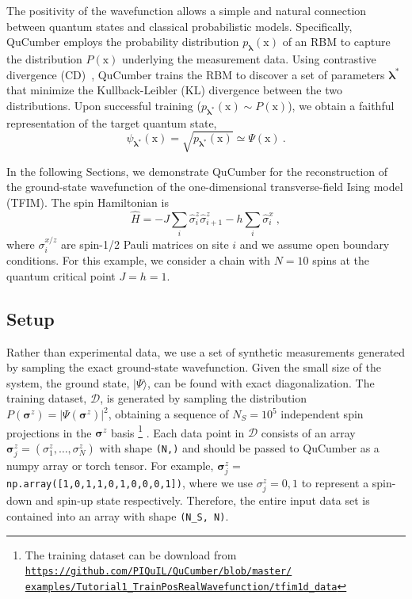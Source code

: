 \documentclass[submission, Phys, hidelnks]{SciPost}
\begin{document}
The positivity of the wavefunction allows a simple and natural connection between quantum states and classical probabilistic models. Specifically, QuCumber employs the probability distribution $p_{\bm{\lambda}}(\bm{\mathrm{x}})$ of an RBM to capture the distribution $P(\bm{\mathrm{x}})$ underlying the measurement data. Using contrastive divergence (CD)~\cite{hinton2002training}, QuCumber trains the RBM to discover a set of parameters $\bm{\lambda}^*$ that minimize the Kullback-Leibler (KL) divergence between the two distributions. Upon successful training ($p_{\bm{\lambda}^*}(\bm{\mathrm{x}})\sim P(\bm{\mathrm{x}})$), we obtain a faithful representation of the target quantum state,
\begin{equation}\label{wfpd}
    \psi_{\bm{\lambda}^*}(\bm{\mathrm{x}})= \sqrt{p_{\bm{\lambda}^*}(\bm{\mathrm{x}})}
    \simeq\Psi(\bm{\mathrm{x}})\:.
\end{equation} 

In the following Sections, we demonstrate QuCumber for the reconstruction of the ground-state wavefunction of the one-dimensional transverse-field Ising model (TFIM). The spin Hamiltonian is 
\begin{equation}
    \hat{H} = -J\sum_i \hat{\sigma}^z_i \hat{\sigma}^z_{i+1} - h \sum_i\hat{\sigma}^x_i\:, \label{TFIM}
\end{equation}
where $\sigma^{x/z}_i$ are spin-1/2 Pauli matrices on site $i$ and we assume open boundary conditions. For this example, we consider a chain with $N=10$ spins at the quantum critical point $J=h=1$.

\subsection{Setup}\label{subsec:example}
Rather than experimental data, we use a set of synthetic measurements generated by sampling the exact ground-state wavefunction. Given the small size of the system, the ground state, $|\Psi\rangle$, can be found with exact diagonalization. The training dataset, $\mathcal{D}$, is generated by sampling the distribution $P(\bm{\sigma}^z)=|\Psi(\bm{\sigma}^z)|^2$, obtaining a sequence of $N_S=10^5$ independent spin projections in the $\bm{\sigma}^z$ basis
\footnote{The training dataset can be download from
    \href{https://github.com/PIQuIL/QuCumber/blob/master/examples/Tutorial1_TrainPosRealWavefunction/tfim1d_data.txt}{\texttt{https://github.com/PIQuIL/QuCumber/blob/master/\\examples/Tutorial1\_TrainPosRealWavefunction/tfim1d\_data}}
}
. Each data point in $\mathcal{D}$ consists of an array $\bm{\sigma}^z_j=(\sigma^z_1,\dots,\sigma^z_N)$ with shape \verb|(N,)| and should be passed to QuCumber as a numpy array or torch tensor. For example, $\bm{\sigma}^z_j=$ \verb|np.array([1,0,1,1,0,1,0,0,0,1])|, where we use $\sigma_j^z=0,1$ to represent a spin-down and spin-up state respectively. Therefore, the entire input data set is contained into an array with shape \verb|(N_S, N)|.
\end{document}
